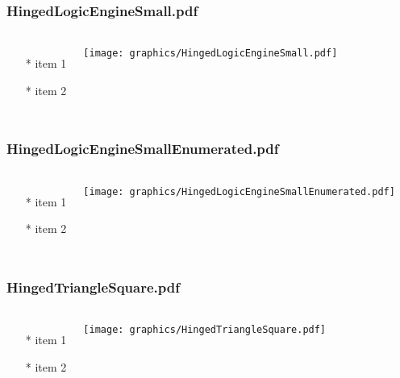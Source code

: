 \begin{frame} \frametitle{HingedLogicEngineSmall.pdf}
    \begin{columns}[c]
        \begin{itemize}
            \item[*] item 1
            \item[*] item 2
        \end{itemize}
        \begin{minipage}{\linewidth}
            \begin{center}
            \texttt{[image: graphics/HingedLogicEngineSmall.pdf]}
            \label{gfx:HingedLogicEngineSmall.pdf}
            \end{center}
        \end{minipage}
    \end{columns}
\end{frame}
\begin{frame} \frametitle{HingedLogicEngineSmallEnumerated.pdf}
    \begin{columns}[c]
        \begin{itemize}
            \item[*] item 1
            \item[*] item 2
        \end{itemize}
        \begin{minipage}{\linewidth}
            \begin{center}
            \texttt{[image: graphics/HingedLogicEngineSmallEnumerated.pdf]}
            \label{gfx:HingedLogicEngineSmallEnumerated.pdf}
            \end{center}
        \end{minipage}
    \end{columns}
\end{frame}
\begin{frame} \frametitle{HingedTriangleSquare.pdf}
    \begin{columns}[c]
        \begin{itemize}
            \item[*] item 1
            \item[*] item 2
        \end{itemize}
        \begin{minipage}{\linewidth}
            \begin{center}
            \texttt{[image: graphics/HingedTriangleSquare.pdf]}
            \label{gfx:HingedTriangleSquare.pdf}
            \end{center}
        \end{minipage}
    \end{columns}
\end{frame}
